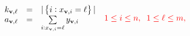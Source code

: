 \begin{displaymath}
	\begin{array}{lcl}
		k_{\mathbf{v},\ell} &=& |\left\lbrace i : x_{\mathbf{v},i}=\ell\right\rbrace|\\
		a_{\mathbf{v}, \ell} &=& \sum\limits_{i:x_{\mathbf{v},i}=\ell} y_{\mathbf{v},i}
	\end{array}\;\;\textcolor{red}{1\leq i \leq n, \;\; 1\leq \ell \leq m,}
\end{displaymath}

